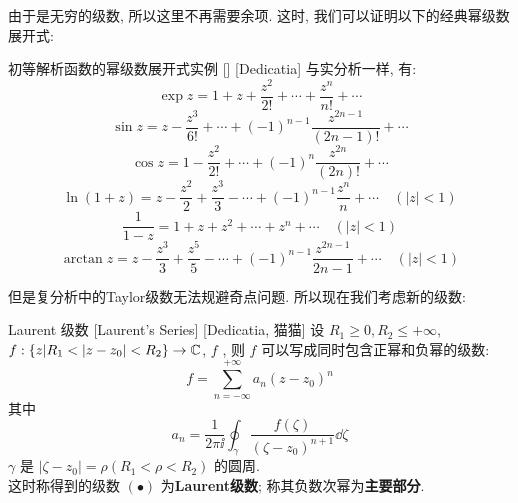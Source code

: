         由于是无穷的级数, 所以这里不再需要余项. 这时, 我们可以证明以下的经典幂级数展开式: 

        \begin{xmp}
            {初等解析函数的幂级数展开式实例}
            []
            [Dedicatia]
            与实分析一样, 有: 
            \[\exp z=1+z+\frac{z^2}{2!}+\cdots+\frac{z^n}{n!}+\cdots\]
            \[\sin z=z-\frac{z^3}{6!}+\cdots+(-1)^{n-1}\frac{z^{2n-1}}{(2n-1)!}+\cdots\]
            \[\cos z=1-\frac{z^2}{2!}+\cdots+(-1)^n\frac{z^{2n}}{(2n)!}+\cdots\]
            \[\ln(1+z)=z-\frac{z^2}{2}+\frac{z^3}{3}-\cdots+(-1)^{n-1}\frac{z^n}{n}+\cdots\quad(|z|<1)\]
            \[\frac{1}{1-z}=1+z+z^2+\cdots+z^n+\cdots\quad(|z|<1)\]
            \[\arctan z=z-\frac{z^3}{3}+\frac{z^5}{5}-\cdots+(-1)^{n-1}\frac{z^{2n-1}}{2n-1}+\cdots\quad(|z|<1)\]
        \end{xmp}

        但是复分析中的Taylor级数无法规避奇点问题. 所以现在我们考虑新的级数: 

        \begin{thm}
            {Laurent 级数}
            [Laurent's Series]
            [Dedicatia, 猫猫]
            设 \(R_1\geq 0, R_2\leq+\infty\), \(f:\{z|R_1<|z-z_0|<R_2\}\to\C\), \(f\) \Analytic{}, 则 \(f\) 可以写成同时包含正幂和负幂的级数: 
            \[f=\sum_{n=-\infty}^{+\infty}a_n(z-z_0)^n\tag{\(\bullet\)}\]
            其中
            \[a_n=\frac{1}{2\pi\ii}\oint_{\gamma}\frac{f(\zeta)}{(\zeta-z_0)^{n+1}}\dd{\zeta}\]
            \(\gamma\) 是 \(|\zeta-z_0|=\rho(R_1<\rho< R_2)\) 的圆周. \\
            这时称得到的级数 \((\bullet)\) 为\textbf{Laurent级数}; 称其负数次幂为\textbf{主要部分}. 
        \end{thm}

